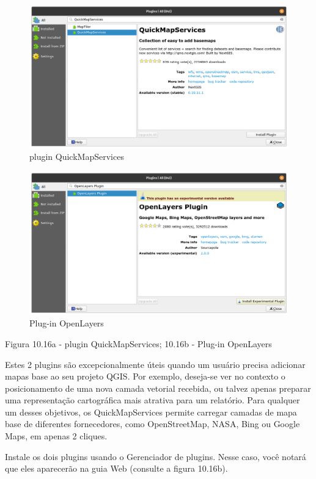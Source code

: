 \documentclass[
]{krantz}
\begin{document}
\begin{figure}
\centering
\includegraphics{media/modulo10/fig1016_a1.png}
\caption{plugin QuickMapServices}
\end{figure}

\begin{figure}
\centering
\includegraphics{media/modulo10/fig1016_a2.png}
\caption{Plug-in OpenLayers}
\end{figure}

Figura 10.16a - plugin QuickMapServices; 10.16b - Plug-in OpenLayers

Estes 2 plugins são excepcionalmente úteis quando um usuário precisa adicionar mapas base ao seu projeto QGIS. Por exemplo, deseja-se ver no contexto o posicionamento de uma nova camada vetorial recebida, ou talvez apenas preparar uma representação cartográfica mais atrativa para um relatório. Para qualquer um desses objetivos, os QuickMapServices permite carregar camadas de mapa base de diferentes fornecedores, como OpenStreetMap, NASA, Bing ou Google Maps, em apenas 2 cliques.

Instale os dois plugins usando o Gerenciador de plugins. Nesse caso, você notará que eles aparecerão na guia Web (consulte a figura 10.16b).
\end{document}
